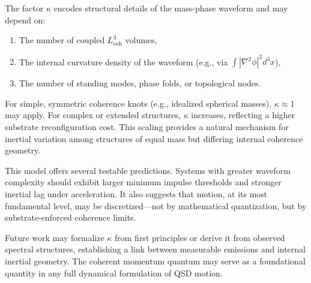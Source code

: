 \documentclass[entropy,article,submit,pdftex,moreauthors]{Definitions/mdpi}
\begin{document}
The factor \( \kappa \) encodes structural details of the mass-phase waveform and may depend on:
\begin{enumerate}
    \item The number of coupled \texorpdfstring{\( L_{\text{coh}}^3 \)}{Lcoh\^{}3} volumes,
    \item The internal curvature density of the waveform (e.g., via \texorpdfstring{\( \int |\nabla^2 \phi|^2 d^3x \)}{∫|∇²ϕ|²}),
    \item The number of standing modes, phase folds, or topological nodes.
\end{enumerate}

For simple, symmetric coherence knots (e.g., idealized spherical masses), \( \kappa \approx 1 \) may apply. For complex or extended structures, \( \kappa \) increases, reflecting a higher substrate reconfiguration cost. This scaling provides a natural mechanism for inertial variation among structures of equal mass but differing internal coherence geometry.

This model offers several testable predictions. Systems with greater waveform complexity should exhibit larger minimum impulse thresholds and stronger inertial lag under acceleration. It also suggests that motion, at its most fundamental level, may be discretized—not by mathematical quantization, but by substrate-enforced coherence limits.

Future work may formalize \( \kappa \) from first principles or derive it from observed spectral structures, establishing a link between measurable emissions and internal inertial geometry. The coherent momentum quantum may serve as a foundational quantity in any full dynamical formulation of QSD motion.
\end{document}
